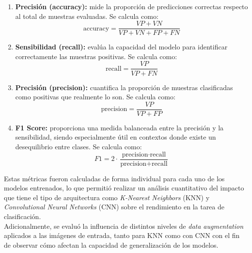 \documentclass[12pt]{article} %
\begin{document}
\begin{enumerate}
    \item \textbf{Precisión (accuracy):} mide la proporción de predicciones correctas respecto al total de muestras evaluadas. Se calcula como:
    \begin{equation}
        \text{accuracy} = \frac{VP + VN}{VP + VN + FP + FN}
    \end{equation}
    
    \item \textbf{Sensibilidad (recall):} evalúa la capacidad del modelo para identificar correctamente las muestras positivas. Se calcula como:
    \begin{equation}
        \text{recall} = \frac{VP}{VP + FN}
    \end{equation}
    
    \item \textbf{Precisión (precision):} cuantifica la proporción de muestras clasificadas como positivas que realmente lo son. Se calcula como:
    \begin{equation}
        \text{precision} = \frac{VP}{VP + FP}
    \end{equation}
    
    \item \textbf{F1 Score:} proporciona una medida balanceada entre la precisión y la sensibilidad, siendo especialmente útil en contextos donde existe un desequilibrio entre clases. Se calcula como:
    \begin{equation}
        F1 = 2 \cdot \frac{\text{precision} \cdot \text{recall}}{\text{precision} + \text{recall}}
    \end{equation}
\end{enumerate}



Estas métricas fueron calculadas de forma individual para cada uno de los modelos entrenados, lo que permitió realizar un análisis cuantitativo del impacto que tiene el tipo de arquitectura como \textit{K-Nearest Neighbors} (KNN) y \textit{Convolutional Neural Networks} (CNN) sobre el rendimiento en la tarea de clasificación. \\

Adicionalmente, se evaluó la influencia de distintos niveles de \textit{data augmentation} aplicados a las imágenes de entrada, tanto para KNN como con CNN con el fin de observar cómo afectan la capacidad de generalización de los modelos.\\
\end{document}

